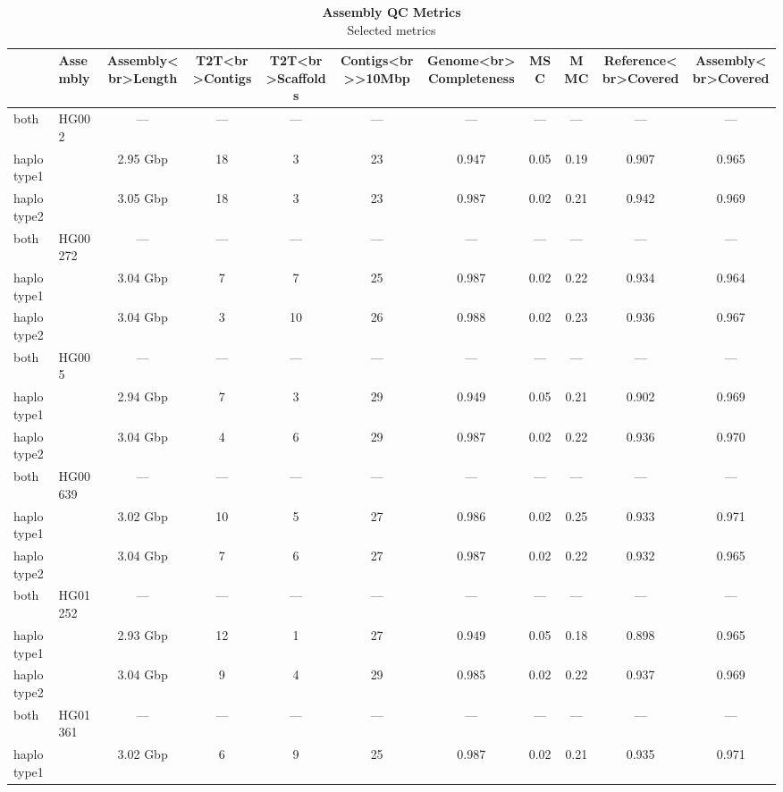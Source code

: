 \begin{table}[t]
\caption*{
{\fontsize{15}{19}\selectfont  \textbf{Assembly QC Metrics}\fontsize{12}{15}\selectfont } \\ 
{\fontsize{11}{14}\selectfont  Selected metrics\fontsize{12}{15}\selectfont }
} 
\fontsize{12.0pt}{14.0pt}\selectfont
\begin{tabular*}{0.9\linewidth}{@{\extracolsep{\fill}}l|lccccccccc}
\toprule
 & Assembly & Assembly<br>Length & T2T<br>Contigs & T2T<br>Scaffolds & Contigs<br>>10Mbp & Genome<br>Completeness & MSC & MMC & Reference<br>Covered & Assembly<br>Covered \\ 
\midrule\addlinespace[2.5pt]
both & {HG002} & {—} & {—} & {—} & {—} & {—} & {—} & {—} & {—} & {—} \\ 
haplotype1 &  & 2.95 Gbp & 18 & 3 & 23 & 0.947 & 0.05 & 0.19 & 0.907 & 0.965 \\ 
haplotype2 &  & 3.05 Gbp & 18 & 3 & 23 & 0.987 & 0.02 & 0.21 & 0.942 & 0.969 \\ 
both & {HG00272} & {—} & {—} & {—} & {—} & {—} & {—} & {—} & {—} & {—} \\ 
haplotype1 &  & 3.04 Gbp & 7 & 7 & 25 & 0.987 & 0.02 & 0.22 & 0.934 & 0.964 \\ 
haplotype2 &  & 3.04 Gbp & 3 & 10 & 26 & 0.988 & 0.02 & 0.23 & 0.936 & 0.967 \\ 
both & {HG005} & {—} & {—} & {—} & {—} & {—} & {—} & {—} & {—} & {—} \\ 
haplotype1 &  & 2.94 Gbp & 7 & 3 & 29 & 0.949 & 0.05 & 0.21 & 0.902 & 0.969 \\ 
haplotype2 &  & 3.04 Gbp & 4 & 6 & 29 & 0.987 & 0.02 & 0.22 & 0.936 & 0.970 \\ 
both & {HG00639} & {—} & {—} & {—} & {—} & {—} & {—} & {—} & {—} & {—} \\ 
haplotype1 &  & 3.02 Gbp & 10 & 5 & 27 & 0.986 & 0.02 & 0.25 & 0.933 & 0.971 \\ 
haplotype2 &  & 3.04 Gbp & 7 & 6 & 27 & 0.987 & 0.02 & 0.22 & 0.932 & 0.965 \\ 
both & {HG01252} & {—} & {—} & {—} & {—} & {—} & {—} & {—} & {—} & {—} \\ 
haplotype1 &  & 2.93 Gbp & 12 & 1 & 27 & 0.949 & 0.05 & 0.18 & 0.898 & 0.965 \\ 
haplotype2 &  & 3.04 Gbp & 9 & 4 & 29 & 0.985 & 0.02 & 0.22 & 0.937 & 0.969 \\ 
both & {HG01361} & {—} & {—} & {—} & {—} & {—} & {—} & {—} & {—} & {—} \\ 
haplotype1 &  & 3.02 Gbp & 6 & 9 & 25 & 0.987 & 0.02 & 0.21 & 0.935 & 0.971 \\ 

\end{tabular*}
\end{table}
